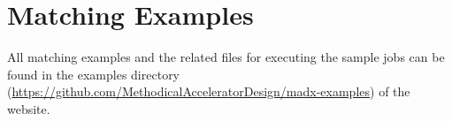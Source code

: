 


%
 
\section{Matching Examples}
\label{sec:match-examples}

All matching examples and the related files for executing the \madx
sample jobs can be found in the examples directory
(\href{https://github.com/MethodicalAcceleratorDesign/madx-examples}{https://github.com/MethodicalAcceleratorDesign/madx-examples})
of the \madx website.

